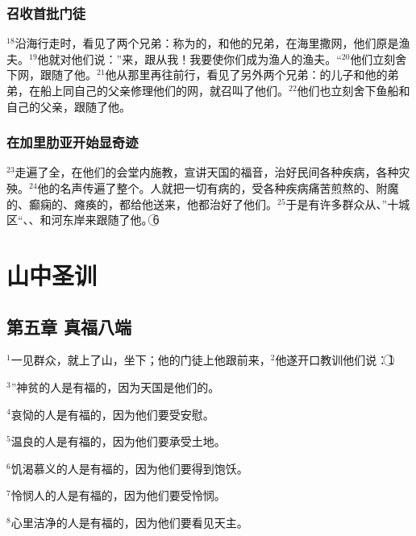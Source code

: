 \subsubsection{召收首批门徒}
$^{18}$\UL[耶稣]沿\UL[加里肋亚]海行走时，看见了两个兄弟：称为\UL[伯多禄]的\UL[西满]，和他的兄弟\UL[安德肋]，在海里撒网，他们原是渔夫。$^{19}$他就对他们说：”来，跟从我！我要使你们成为渔人的渔夫。“$^{20}$他们立刻舍下网，跟随了他。$^{21}$他从那里再往前行，看见了另外两个兄弟：\UL[载伯德]的儿子\UL[雅各伯]和他的弟弟\UL[若望]，在船上同自己的父亲\UL[载伯德]修理他们的网，就召叫了他们。$^{22}$他们也立刻舍下鱼船和自己的父亲，跟随了他。


\subsubsection{在加里肋亚开始显奇迹}
$^{23}$\UL[耶稣]走遍了全\UL[加里肋亚]，在他们的会堂内施教，宣讲天国的福音，治好民间各种疾病，各种灾殃。$^{24}$他的名声传遍了整个\UL[叙利亚]。人就把一切有病的，受各种疾病痛苦煎熬的、附魔的、癫痫的、瘫痪的，都给他送来，他都治好了他们。$^{25}$于是有许多群众从\UL[加里肋亚]、”十城区“、\UL[耶路撒冷]、\UL[犹太]和\UL[约但]河东岸来跟随了他。\textcircled{6}


\section{山中圣训}


\subsection{第五章 真福八端}
$^{1}$\UL[耶稣]一见群众，就上了山，坐下；他的门徒上他跟前来，$^{2}$他遂开口教训他们说：\textcircled{1}

$^{3}$”神贫的人是有福的，因为天国是他们的。

$^{4}$哀恸的人是有福的，因为他们要受安慰。

$^{5}$温良的人是有福的，因为他们要承受土地。

$^{6}$饥渴慕义的人是有福的，因为他们要得到饱饫。

$^{7}$怜悯人的人是有福的，因为他们要受怜悯。

$^{8}$心里洁净的人是有福的，因为他们要看见天主。

